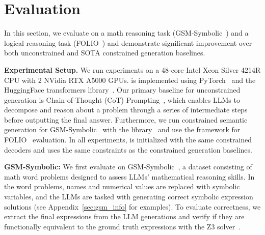 
\section{Evaluation}
 


In this section, we evaluate \Tool{} on a math reasoning task (GSM-Symbolic~\cite{mirzadeh2024gsmsymbolicunderstandinglimitationsmathematical}) and a logical reasoning task (FOLIO~\cite{han2024FOLIOnaturallanguagereasoning}) and demonstrate significant improvement over both unconstrained and SOTA constrained generation baselines. 

\noindent \textbf{Experimental Setup.}
We run experiments on a 48-core Intel Xeon Silver 4214R CPU with 2 NVidia RTX A5000 GPUs. 
\Tool{} is implemented using PyTorch~\cite{NEURIPS2019_9015} and the HuggingFace transformers library~\cite{wolf-etal-2020-transformers}. Our primary baseline for unconstrained generation is Chain-of-Thought (CoT) Prompting~\cite{cotGoogle}, which enables LLMs to decompose and reason about a problem through a series of intermediate steps before outputting the final answer. Furthermore, we run constrained semantic generation for GSM-Symbolic~\cite{mirzadeh2024gsmsymbolicunderstandinglimitationsmathematical} with the \itergen{} library~\cite{ugare2024itergeniterativestructuredllm} and use the \syncode{} framework for FOLIO~\cite{han2024FOLIOnaturallanguagereasoning} evaluation. In all experiments, \Tool{} is initialized with the same constrained decoders and uses the same constraints as the constrained generation baselines.

\textbf{GSM-Symbolic: }We first evaluate \Tool{} on GSM-Symbolic~\cite{mirzadeh2024gsmsymbolicunderstandinglimitationsmathematical}, a dataset consisting of math word problems designed to assess LLMs' mathematical reasoning skills. 
In the word problems, names and numerical values are replaced with symbolic variables, and the LLMs are tasked with generating correct symbolic expression solutions (see Appendix~\ref{sec:gsm_info} for examples). To evaluate correctness, we extract the final expressions from the LLM generations and verify if they are functionally equivalent to the ground truth expressions with the Z3 solver~\cite{z3}.

